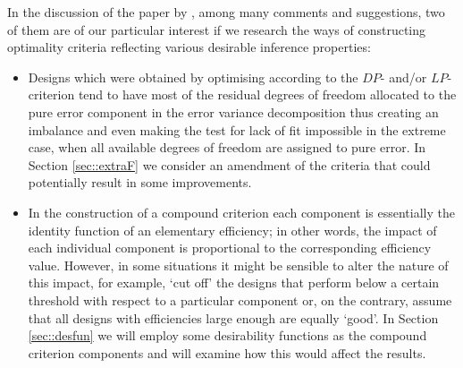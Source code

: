 In the discussion of the paper by \citet{GilmourTrinca2012}, among many comments and suggestions, two of them are of our particular interest if we research the ways of constructing optimality criteria reflecting various desirable inference properties:
\begin{itemize}
\item Designs which were obtained by optimising according to the $DP$- and/or $LP$-criterion tend to have most of the residual degrees of freedom allocated to the pure error component in the error variance decomposition thus creating an imbalance and even making the test for lack of fit impossible in the extreme case, when all available degrees of freedom are assigned to pure error. In Section \ref{sec::extraF} we consider an amendment of the criteria that could potentially result in some improvements.
\item In the construction of a compound criterion each component is essentially the identity function of an elementary efficiency; in other words, the impact of each individual component is proportional to the corresponding efficiency value. However, in some situations it might be sensible to alter the nature of this impact, for example, `cut off' the designs that perform below a certain threshold with respect to a particular component or, on the contrary, assume that all designs with efficiencies large enough are equally `good'. In Section \ref{sec::desfun} we will employ some desirability functions as the compound criterion components and will examine how this would affect the results. 
\end{itemize} 

